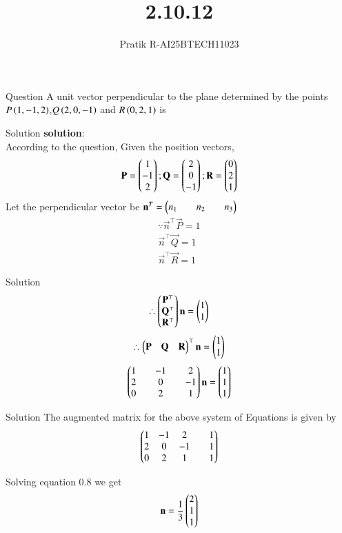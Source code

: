 \documentclass{beamer}
\title %
{2.10.12}
\author %
{Pratik R-AI25BTECH11023}
\begin{document}
\frame{\titlepage}
\begin{frame}{Question}
A unit vector perpendicular to the plane determined by the points
$P\left(1,-1,2\right)$,$Q\left(2,0,-1\right)$ and $R\left(0,2,1\right)$ is 
\end{frame}




\begin{frame}{Solution}
\textbf{solution}:\\

According to the question, 
Given the position vectors,
\begin{align}
    \mathbf{P}=\begin{pmatrix}1\\-1\\2\end{pmatrix};
    \mathbf{Q}=\begin{pmatrix}2\\0\\-1\end{pmatrix};
    \mathbf{R}=\begin{pmatrix}0\\2\\1\end{pmatrix}
\end{align}
Let the perpendicular vector be $\mathbf{n}^T=\begin{pmatrix}n_1&&n_2&&n_3\end{pmatrix}$
\begin{align}
    \because \vec{n}^\top \vec{P}=1 \\
    \vec{n}^\top \vec{Q}=1 \\
    \vec{n}^\top \vec{R}=1 
\end{align}
\end{frame}
\begin{frame}{Solution}
\begin{align}
    \therefore \begin{pmatrix}\mathbf{P}^\top \\\mathbf{Q}^\top \\\mathbf{R}^\top\end{pmatrix}\mathbf{n}= \begin{pmatrix}1 \\ 1\end{pmatrix}
\end{align}
\begin{align}
    \therefore \begin{pmatrix}\mathbf{P} & \mathbf{Q} & \mathbf{R}\end{pmatrix}^\top \mathbf{n}= \begin{pmatrix}1 \\ 1\end{pmatrix}
\end{align}
\begin{align}
    \begin{pmatrix}1&&-1&&2\\2&&0&&-1 \\ 0&&2&&1\end{pmatrix} \mathbf{n}= \begin{pmatrix}1 \\ 1 \\ 1\end{pmatrix}
\end{align}
\end{frame}
\begin{frame}{Solution}
The augmented matrix for the above system of Equations is given by
\begin{align}
    \begin{pmatrix}1&-1&2&&1\\2&0&-1&&1\\0&2&1&&1\end{pmatrix} 
\end{align}

Solving equation 0.8 we get
\begin{align}
    \mathbf{n}=\frac{1}{3}\begin{pmatrix}2\\1\\1\end{pmatrix}
\end{align}
\end{frame}
\end{document}
